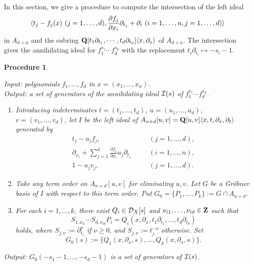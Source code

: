 \documentclass[12pt]{article}
\def\pd#1{ \partial_{#1} }
\def\Q{{\bf Q}}
\def\Z{ {\bf Z} }
\def\Dsc{ {\cal D} }
\def\Isc{ {\cal I} }
\newtheorem{procedure}[theorem]{Procedure}
\begin{document}
In this section, we give a procedure to compute
the intersection of the left ideal
$$
\langle t_j-f_j(x) \ (j=1, \ldots, d), 
                {{\partial f_j} \over
                 {\partial x_i}} \pd{t_j} + \pd{i} \ 
                (i=1, \ldots, n, j=1, \ldots, d)
\rangle $$ 
in $A_{d+n}$ and the subring
$ \Q[ t_1 \pd{t_1}, \cdots, t_d \pd{t_d}] \langle x, \pd{x} \rangle $
of $A_{d+n}$.
The intersection gives the annihilating ideal for
$f_1^{s_1} \cdots f_d^{s_d}$ with the replacement
$ t_i \pd{t_i} \mapsto -s_i-1$.

\begin{procedure}
\label{procedure:intersectionWithSubring}
{\rm

\noindent
Input: polynomials $f_1,\dots,f_d$ in $x = (x_1,\dots,x_n)$. \\
Output:  a set of generators of the annihilating ideal
$\Isc(s)$
of $f_1^{s_1} \cdots f_d^{s_d}$.

\begin{enumerate}
\item
Introducing indeterminates $t = (t_1,\dots,t_d)$, $u = (u_1,\dots,u_d)$, 
$v = (v_1,\dots,v_d)$, let $I$ be the left ideal of 
$A_{n+d}[u,v] = \Q[u,v]\langle x,t, \partial_x,\partial_t\rangle$
generated by
\begin{eqnarray}
t_j-u_jf_j,\,\, &\quad& (j=1,\dots,d),
\label{equation:uv1}\\
\partial_{x_i} + \sum_{j=1}^d\frac{\partial f_j}{\partial x_i}
u_j\partial_{t_j} &\quad& (i=1,\dots,n),
\label{equation:uv2}\\
1-u_jv_j,\,\, &\quad& (j=1,\dots,d).
\label{equation:uv3}
\end{eqnarray}
\item
Take any term order on $A_{n+d}[u,v]$ for eliminating 
$u,v$.  Let $G$ be a Gr\"obner basis of $I$ with respect to this term order.
Put $G_0 = \{P_1,\dots,P_k\} := G \cap A_{n+d}$.  
\item
For each $i = 1,\dots,k$, there exist $Q_i \in \Dsc_X[s]$ and 
$\nu_{i1},\dots,\nu_{id} \in \Z$ such that
$$
S_{1,\nu_{i1}}\cdots S_{d,\nu_{id}}P_i = 
Q_i(x,\partial_x, t_1\partial_{t_1},\dots,t_d\partial_{t_d}) 
$$ 
holds, where $S_{j,\nu} := \partial_{t_j}^\nu$ if $\nu \geq 0$, 
and $S_{j,\nu} := t_j^{-\nu}$ otherwise.  Set
$$
G_0(s) := \{Q_1(x,\partial_x,s),\dots,Q_k(x,\partial_x,s)\}.
$$
\end{enumerate}
Output: $G_0(-s_1-1,\dots,-s_d-1)$ is a set of generators of $\Isc(s)$.
}
\end{procedure}
\end{document}
